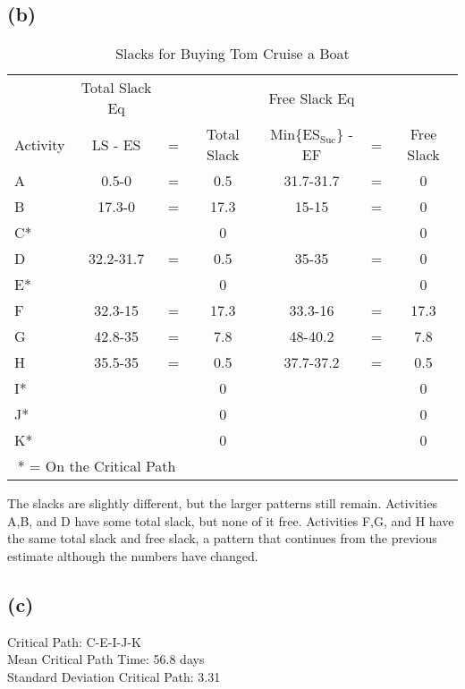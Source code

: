 \documentclass{article}
\begin{document}
	\subsection*{(b)}
	{\renewcommand{\arraystretch}{1.2} 
	\begin{table}[h!tbp]
  		\begin{center}
    		\caption{Slacks for Buying Tom Cruise a Boat}
    		\label{tab:table2}
			
    		\begin{tabular}{lcccccc}
				 & Total Slack Eq &  &  & Free Slack Eq & &\\
				Activity & LS - ES & = & Total Slack & Min\{ES$_{\text{Suc}}$\} - EF &= & Free Slack \\
				\hline
      			A  & 0.5-0  & = & 0.5  & 31.7-31.7 & = & 0 \\
      			B  & 17.3-0 & = & 17.3 & 15-15     & = & 0 \\
				C* &        &   & 0    &           &   & 0 \\
				D  & 32.2-31.7  & = & 0.5   & 35-35 & = & 0 \\
				E* &        &   & 0   &       &   & 0 \\
				F  & 32.3-15  & = & 17.3  & 33.3-16 & = & 17.3\\
				G  & 42.8-35  & = & 7.8   & 48-40.2 & = & 7.8 \\
				H  & 35.5-35  & = & 0.5   & 37.7-37.2 & = & 0.5 \\
				I* &        &   & 0   &       &   & 0 \\
				J* &        &   & 0   &       &   & 0 \\
				K* &        &   & 0   &       &   & 0 \\
				\hline
				\multicolumn{3}{c}{* = On the Critical Path}\\
    		\end{tabular}
  		\end{center}
	\end{table}
	}
	
	\noindent The slacks are slightly different, but the larger patterns still remain. Activities A,B, and D have some total slack, but none of it free. Activities F,G, and H have the same total slack and free slack, a pattern that continues from the previous estimate although the numbers have changed.
	
	\subsection*{(c)}
	\noindent Critical Path: C-E-I-J-K\\
	Mean Critical Path Time: 56.8 days\\
	Standard Deviation Critical Path: 3.31\\
	
\end{document}
